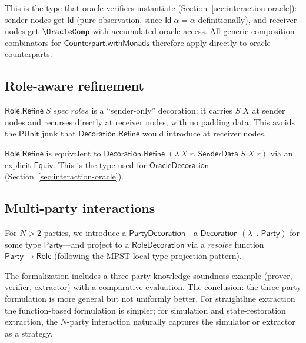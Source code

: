 This is the type that oracle verifiers instantiate (Section~\ref{sec:interaction-oracle}):
sender nodes get $\mathsf{Id}$ (pure observation, since $\mathsf{Id}\;\alpha =
\alpha$ definitionally), and receiver nodes get $\OracleComp$ with accumulated
oracle access.  All generic composition combinators for
$\mathsf{Counterpart.withMonads}$ therefore apply directly to oracle
counterparts.

\subsection{Role-aware refinement}

\begin{definition}
  \label{int:role-refine}
  $\mathsf{Role.Refine}\;S\;\mathit{spec}\;\mathit{roles}$ is a
  ``sender-only'' decoration: it carries $S\;X$ at sender nodes and recurses
  directly at receiver nodes, with no padding data.  This avoids the
  $\mathsf{PUnit}$ junk that $\mathsf{Decoration.Refine}$ would introduce at
  receiver nodes.
\end{definition}

$\mathsf{Role.Refine}$ is equivalent to
$\mathsf{Decoration.Refine}\;(\lambda\,X\;r.\;\mathsf{SenderData}\;S\;X\;r)$
via an explicit $\mathsf{Equiv}$.  This is the type used for
$\mathsf{OracleDecoration}$ (Section~\ref{sec:interaction-oracle}).

\subsection{Multi-party interactions}

For $N > 2$ parties, we introduce a $\mathsf{PartyDecoration}$---a
$\mathsf{Decoration}\;(\lambda\,\_.\;\mathsf{Party})$ for some type
$\mathsf{Party}$---and project to a $\mathsf{RoleDecoration}$ via a
\emph{resolve} function $\mathsf{Party} \to \mathsf{Role}$ (following the
MPST local type projection pattern).

The formalization includes a three-party knowledge-soundness example (prover,
verifier, extractor) with a comparative evaluation.  The conclusion: the
three-party formulation is more general but not uniformly better.  For
straightline extraction the function-based formulation is simpler; for
simulation and state-restoration extraction, the $N$-party interaction
naturally captures the simulator or extractor as a strategy.
